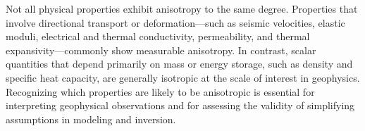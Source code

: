 Not all physical properties exhibit anisotropy to the same degree. Properties that involve directional transport or deformation---such as seismic velocities, elastic moduli, electrical and thermal conductivity, permeability, and thermal expansivity---commonly show measurable anisotropy. In contrast, scalar quantities that depend primarily on mass or energy storage, such as density and specific heat capacity, are generally isotropic at the scale of interest in geophysics. Recognizing which properties are likely to be anisotropic is essential for interpreting geophysical observations and for assessing the validity of simplifying assumptions in modeling and inversion.




